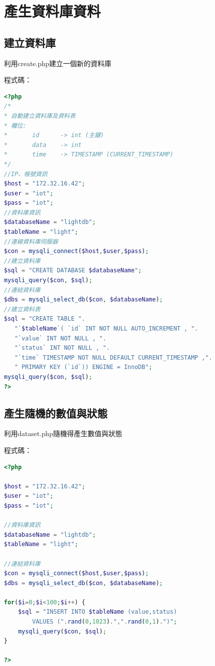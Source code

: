 \documentclass[12pt,a4paper]{article}
\begin{document}
\section{產生資料庫資料}
{
\subsection{建立資料庫}
利用create.php建立一個新的資料庫

程式碼：
\begin{shaded}
\begin{lstlisting}[language=PHP]
<?php
/*
* 自動建立資料庫及資料表
* 欄位:
*       id      -> int (主鍵)
*       data    -> int
*       time    -> TIMESTAMP (CURRENT_TIMESTAMP)
*/
//IP、帳號資訊
$host = "172.32.16.42";
$user = "iot";
$pass = "iot";
//資料庫資訊
$databaseName = "lightdb";
$tableName = "light";
//連線資料庫伺服器
$con = mysqli_connect($host,$user,$pass);
//建立資料庫
$sql = "CREATE DATABASE $databaseName";
mysqli_query($con, $sql);
//連結資料庫
$dbs = mysqli_select_db($con, $databaseName);
//建立資料表
$sql = "CREATE TABLE ". 
   "`$tableName`( `id` INT NOT NULL AUTO_INCREMENT , ".           
   "`value` INT NOT NULL , ".
   "`status` INT NOT NULL , ".
   "`time` TIMESTAMP NOT NULL DEFAULT CURRENT_TIMESTAMP ,".        
   " PRIMARY KEY (`id`)) ENGINE = InnoDB";
mysqli_query($con, $sql);
?>
\end{lstlisting}
\end{shaded}

\subsection{產生隨機的數值與狀態}
利用dataset.php隨機得產生數值與狀態

程式碼：
\begin{shaded}
\begin{lstlisting}[language=PHP]
<?php

$host = "172.32.16.42";
$user = "iot";
$pass = "iot";

//資料庫資訊
$databaseName = "lightdb";
$tableName = "light";

//連結資料庫
$con = mysqli_connect($host,$user,$pass);
$dbs = mysqli_select_db($con, $databaseName);

for($i=0;$i<100;$i++) {
	$sql = "INSERT INTO $tableName (value,status) 
		VALUES (".rand(0,1023).",".rand(0,1).")";
	mysqli_query($con, $sql);
}

?>
\end{lstlisting}
\end{shaded}

}
\end{document}
